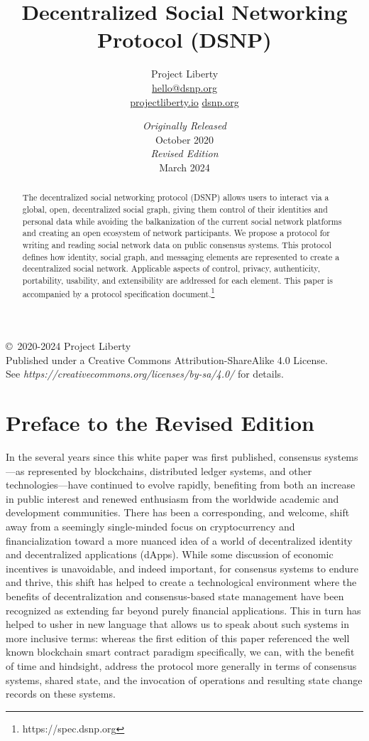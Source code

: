 \documentclass[12pt,letterpaper]{article}
\title{Decentralized Social Networking Protocol (DSNP)}
\author{
	Project Liberty\\
	\href{mailto:hello@dsnp.org}{hello@dsnp.org}\\
	\url{projectliberty.io} \url{dsnp.org}
}
\date{\textit{Originally Released}\\
October 2020\\
\textit{Revised Edition}\\
March 2024}
\begin{document}
\maketitle

\begin{abstract}
	The decentralized social networking protocol (DSNP) allows users to interact via a global,
	open, decentralized social graph, giving them control of their identities and personal data
	while avoiding the balkanization of the current social network
	platforms and creating an open ecosystem of network participants. We propose a protocol
	for writing and reading social network data on public consensus systems.
	This protocol defines how identity, social graph, and messaging elements are represented
	to create a decentralized social network. Applicable aspects of control, privacy,
	authenticity, portability, usability, and extensibility are addressed for each element.
	This paper is accompanied by a protocol specification document.\footnote{https://spec.dsnp.org}
\end{abstract}

\vfill
\copyright\, 2020-2024 Project Liberty\\
Published under a Creative Commons Attribution-ShareAlike 4.0 License.\\
See \textit{https://creativecommons.org/licenses/by-sa/4.0/} for details.

\thispagestyle{empty}
\clearpage

\raggedright

\section*{Preface to the Revised Edition}

In the several years since this white paper was first published, consensus systems---as
represented by blockchains, distributed ledger systems, and other technologies---have
continued to evolve rapidly, benefiting from both an increase in public interest and renewed
enthusiasm from the worldwide academic and development communities. There has been a
corresponding, and welcome, shift away from a seemingly single-minded focus on
cryptocurrency and financialization toward a more nuanced idea of a world of decentralized
identity and decentralized applications (dApps). While some discussion of economic
incentives is unavoidable, and indeed important, for consensus systems to endure and thrive,
this shift has helped to create a technological environment where the benefits of
decentralization and consensus-based state management have been recognized as extending far
beyond purely financial applications. This in turn has helped to usher in new language that
allows us to speak about such systems in more inclusive terms: whereas the first edition of
this paper referenced the well known blockchain smart contract paradigm specifically, we
can, with the benefit of time and hindsight, address the protocol more generally in terms of
consensus systems, shared state, and the invocation of operations and resulting state change
records on these systems.
\end{document}
